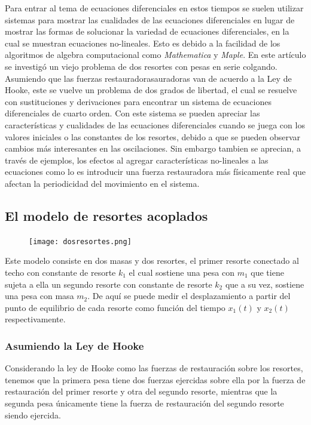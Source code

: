 \documentclass{article}
\begin{document}
Para entrar al tema de ecuaciones diferenciales en estos tiempos se suelen utilizar sistemas para mostrar las cualidades de las ecuaciones diferenciales en lugar de mostrar las formas de solucionar la variedad de ecuaciones diferenciales, en la cual se muestran ecuaciones no-lineales. Esto es debido a la facilidad de los algoritmos de algebra computacional como \textit{Mathematica} y \textit{Maple}. En este artículo se investigó un viejo problema de dos resortes con pesas en serie colgando. Asumiendo que las fuerzas restauradorasauradoras van de acuerdo a la Ley de Hooke, este se vuelve un problema de dos grados de libertad, el cual se resuelve con sustituciones y derivaciones para encontrar un sistema de ecuaciones diferenciales de cuarto orden. 
Con este sistema se pueden apreciar las características y cualidades de las ecuaciones diferenciales cuando se juega con los valores iniciales o las constantes de los resortes, debido a que se pueden observar cambios más interesantes en las oscilaciones. Sin embargo tambien se aprecian, a través de ejemplos, los efectos al agregar características no-lineales a las ecuaciones como lo es introducir una fuerza restauradora más físicamente real que afectan la periodicidad del movimiento en el sistema.

\subsection{El modelo de resortes acoplados}
\begin{figure}
    \centering
    \texttt{[image: dosresortes.png]}
\end{figure}
Este modelo consiste en dos masas y dos resortes, el primer resorte conectado al techo con constante de resorte $k_1$ el cual sostiene una pesa con $m_1$ que tiene sujeta a ella un segundo resorte con constante de resorte $k_2$ que a su vez, sostiene una pesa con masa $m_2$. De aquí se puede medir el desplazamiento a partir del punto de equilibrio de cada resorte como función del tiempo $x_1(t)$ y $x_2(t)$ respectivamente.

\subsubsection{Asumiendo la Ley de Hooke}

Considerando la ley de Hooke como las fuerzas de restauración sobre los resortes, tenemos que la primera pesa tiene dos fuerzas ejercidas sobre ella por la fuerza de restauración del primer resorte y otra del segundo resorte, mientras que la segunda pesa únicamente tiene la fuerza de restauración del segundo resorte siendo ejercida.
\end{document}
